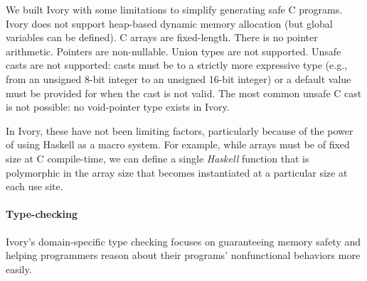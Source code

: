 We built Ivory with some limitations to simplify generating safe C programs.
Ivory does not support heap-based dynamic memory allocation (but global
variables can be defined).  C arrays are fixed-length.  There is no pointer
arithmetic.  Pointers are non-nullable.  Union types are not supported.  Unsafe
casts are not supported: casts must be to a strictly more expressive type (e.g.,
from an unsigned 8-bit integer to an unsigned 16-bit integer) or a default value
must be provided for when the cast is not valid. The most common unsafe C cast
is not possible: no void-pointer type exists in Ivory.

In Ivory, these have not been limiting factors, particularly because of the
power of using Haskell as a macro system.  For example, while arrays must be of
fixed size at C compile-time, we can define a single \emph{Haskell} function
that is polymorphic in the array size that becomes instantiated at a particular
size at each use site.  %



\paragraph{Type-checking}
Ivory's domain-specific type checking focuses on guaranteeing memory
safety and helping programmers reason about their programs' nonfunctional
behaviors more easily.



